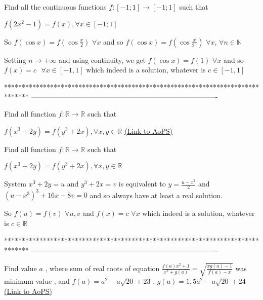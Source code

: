 \begin{solution}
	\begin{tcolorbox}Find all the continuous functions $ f: [ -1;1  ]\rightarrow  [ -1;1  ]  $ such that  
                                                                          
$f ( 2x^{2}  -1)=f ( x  ),\forall x\in  [ -1;1  ]$\end{tcolorbox}

So $f(\cos x)=f(\cos \frac x2)$ $\forall x$ and so $f(\cos x)=f(\cos\frac x{2^n})$ $\forall x$, $\forall n\in\mathbb N$

Setting $n\to+\infty$ and using continuity, we get $f(\cos x)=f(1)$ $\forall x$ and so $\boxed{f(x)=c\text{  }\forall x\in[-1,1]}$ which indeed is a solution, whatever is $c\in[-1,1]$
\end{solution}
*******************************************************************************
-------------------------------------------------------------------------------

\begin{problem}
	Find all function $f : \mathbb{R} \to \mathbb{R}$ such that 

$ f(x^{3}+2y)=f(y^{3}+2x),\forall x,y\in \mathbb{R}$
	\flushright \href{https://artofproblemsolving.com/community/c6h618513}{(Link to AoPS)}
\end{problem}



\begin{solution}
	\begin{tcolorbox}Find all function $f : \mathbb{R} \to \mathbb{R}$ such that 

$ f(x^{3}+2y)=f(y^{3}+2x),\forall x,y\in \mathbb{R}$\end{tcolorbox}
System $x^3+2y=u$ and $y^3+2x=v$ is equivalent to $y=\frac{u-x^3}2$ and $(u-x^3)^3+16x-8v=0$ and so always have at least a real solution.

So $f(u)=f(v)$ $\forall u,v$ and $\boxed{f(x)=c}$ $\forall x$ which indeed is a solution, whatever is $c\in\mathbb R$
\end{solution}
*******************************************************************************
-------------------------------------------------------------------------------

\begin{problem}
	Find value $a$ , where sum of real roots of equation $\frac{f(a)x^2 +1}{x^2+g(a)}=\sqrt{\frac{xg(a)-1}{f(a)-x}}$ was minimum value , and $f(a)=a^2-a\sqrt{20} +23$ , $g(a)=1,5a^2-a\sqrt{20}+24$
	\flushright \href{https://artofproblemsolving.com/community/c6h618688}{(Link to AoPS)}
\end{problem}



